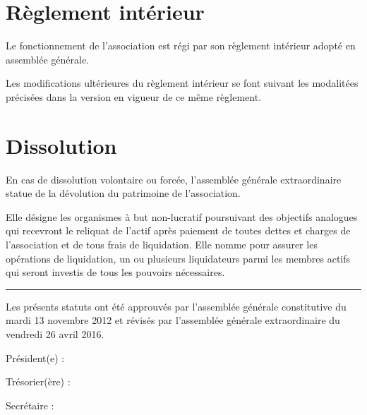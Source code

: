 \documentclass[a4paper, 11pt]{article}
\newcommand{\dateAGC}{mardi 13 novembre 2012}
\newcommand{\dateAGE}{vendredi 26 avril 2016}
\newcommand\sep{\noindent\rule{\linewidth}{.5pt}}
\begin{document}

\section{Règlement intérieur} %

Le fonctionnement de l'association est régi par son règlement intérieur adopté en assemblée générale.

Les modifications ultérieures du règlement intérieur se font suivant les modalitées précisées dans la version en vigueur
de ce même règlement.


\section{Dissolution} %

En cas de dissolution volontaire ou forcée, l'assemblée générale extraordinaire statue de la dévolution du patrimoine de
l'association.

Elle désigne les organismes à but non-lucratif poursuivant des objectifs analogues qui recevront le reliquat de l'actif
après paiement de toutes dettes et charges de l'association et de tous frais de liquidation. Elle nomme pour assurer les
opérations de liquidation, un ou plusieurs liquidateurs parmi les membres actifs qui seront investis de tous les
pouvoirs nécessaires.



\bigskip\bigskip

\sep

\bigskip\bigskip

Les présents statuts ont été approuvés par l'assemblée générale constitutive du \dateAGC{} et révisés par l'assemblée générale extraordinaire du \dateAGE{}.

\bigskip\bigskip

Président(e) :

\bigskip\bigskip

Trésorier(ère) :

\bigskip\bigskip

Secrétaire :
\end{document}
